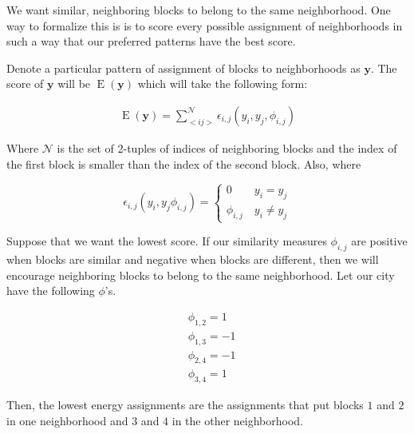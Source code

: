 We want similar, neighboring blocks to belong to the same
neighborhood. One way to formalize this is is to score every possible
assignment of neighborhoods in such a way that our preferred patterns
have the best score.

Denote a particular pattern of assignment of blocks to neighborhoods
as $\mathbf{y}$.  The score of $\mathbf{y}$ will be
$\operatorname{E}(\mathbf{y})$ which will take the following form:

\begin{align}
\operatorname{E}(\mathbf{y}) = \sum_{<i j>}^{\mathcal{N}}\epsilon_{i,j}(y_i,y_j,\phi_{i,j})
\end{align}

Where $\mathcal{N}$ is the set of 2-tuples of indices of neighboring
blocks and the index of the first block is smaller than the index of
the second block. Also, where

\begin{equation}
\epsilon_{i,j}(y_i,y_j\phi_{i,j}) = \begin{cases}
  0 \quad\quad y_i = y_j \\
  \phi_{i,j} \quad y_i \neq y_j
\end{cases}
\end{equation}

Suppose that we want the lowest score. If our similarity
measures $\phi_{i,j}$ are positive when blocks are similar and negative
when blocks are different, then we will encourage neighboring blocks to
belong to the same neighborhood. Let our city have the
following $\phi$'s.

\begin{align*}
&\phi_{1,2} = 1 \\
&\phi_{1,3} = -1 \\
&\phi_{2,4} = -1 \\
&\phi_{3,4} = 1
\end{align*} 

Then, the lowest energy assignments are the assignments that put
blocks $1$ and $2$ in one neighborhood and $3$ and $4$ in the other
neighborhood.

\begin{figure}[!h]
\centering


\end{figure}

